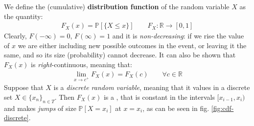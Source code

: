 \documentclass[../template.tex]{subfiles}
\begin{document}
\medskip

We define the (cumulative) \textbf{distribution function} of the random variable $X$ as the quantity:
\begin{align*}
    F_X(x) = \mathbb{P}[\{X \leq x\}] \qquad F_X\colon \mathbb{R} \to [0,1]
\end{align*} 
Clearly, $F(-\infty) = 0$, $F(\infty) = 1$ and it is \textit{non-decreasing}: if we rise the value of $x$ we are either including new possible outcomes in the event, or leaving it the same, and so its size (probability) cannot decrease. It can also be shown that $F_X(x)$ is \textit{right}-continuous, meaning that:
\begin{align*}
    \lim_{x \to c^+} F_X(x) = F_X(c) \qquad \forall c \in \mathbb{R}
\end{align*} 
Suppose that $X$ is a \textit{discrete random variable}, meaning that it  values in a discrete set $X \in \{x_n\}_{n \in T}$. Then $F_X(x)$ is a , that is constant in the intervals $[x_{i-1}, x_i)$ and makes \textit{jumps} of size $\mathbb{P}[X=x_i]$ at $x=x_i$, as can be seen in fig. \ref{fig:cdf-discrete}.  
\end{document}
